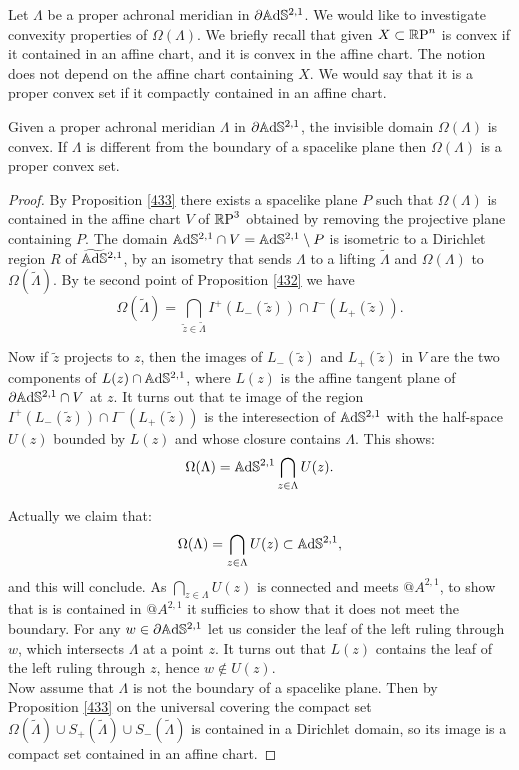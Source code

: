 Let $\Lambda$ be a proper achronal meridian in $\partial\mathbb{A}\mathrm{d}\mathbb{S}^{2,1}$. We would like to investigate convexity properties of $\Omega(\Lambda)$. We briefly recall that given $X \subset \mathbb{R}\text{P}^n$ is convex if it contained in an affine chart, and it is convex in the affine chart. The notion does not depend on the affine chart containing $X$. We would say that it is a proper convex set if it compactly contained in an affine chart. 

\begin{proposition}\label{461}
    Given a proper achronal meridian $\Lambda$ in $\partial\mathbb{A}\mathrm{d}\mathbb{S}^{2,1}$, the invisible domain $\Omega(\Lambda)$ is convex. If $\Lambda$ is different from the boundary of a spacelike plane then $\Omega(\Lambda)$ is a proper convex set.
\end{proposition}

\begin{proof}
    By Proposition \ref{433} there exists a spacelike plane $P$ such that $\Omega(\Lambda)$ is contained in the affine chart $V$ of $\mathbb{R}\text{P}^3$ obtained by removing the projective plane containing $P$. The domain $\mathbb{A}\mathrm{d}\mathbb{S}^{2,1}\cap V=\mathbb{A}\mathrm{d}\mathbb{S}^{2,1}\setminus P$ is isometric to a Dirichlet region $R$ of $\widetilde{\mathbb{A}\mathrm{d}\mathbb{S}}{}^{2,1}$, by an isometry that sends $\Lambda$ to a lifting $\widetilde{\Lambda}$ and $\Omega(\Lambda)$ to $\Omega(\widetilde{\Lambda})$. By te second point of Proposition \ref{432} we have 
    \[
        \Omega(\widetilde{\Lambda})=\bigcap_{\widetilde{z}\in\widetilde{\Lambda}}I^+(L_-(\widetilde{z}))\cap I^-(L_+(\widetilde{z})).
    \]

    Now if $\widetilde{z}$ projects to $z$, then the images of $L_-(\widetilde{z})$ and $L_+(\widetilde{z})$ in $V$ are the two components of $L(z)\cap \mathbb{A}\mathrm{d}\mathbb{S}^{2,1}$, where $L(z)$ is the affine tangent plane of $\partial\mathbb{A}\mathrm{d}\mathbb{S}^{2,1}\cap V$ at $z$. It turns out that te image of the region $I^+(L_-(\widetilde{z}))\cap I^-(L_+(\widetilde{z}))$ is the interesection of $\mathbb{A}\mathrm{d}\mathbb{S}^{2,1}$ with the half-space $U(z)$ bounded by $L(z)$ and whose closure contains $\Lambda$. This shows: 
\[
    \Omega(\Lambda)=\mathbb{A}\mathrm{d}\mathbb{S}^{2,1}\bigcap_{z\in\Lambda}U(z).
\] 

Actually we claim that:
\[
    \Omega(\Lambda)=\bigcap_{z\in\Lambda}U(z)\subset \mathbb{A}\mathrm{d}\mathbb{S}^{2,1},
\]
and this will conclude. As $\bigcap_{z\in\Lambda}U(z)$ is connected and meets $@A^{2,1}$, to show that is is contained in $@A^{2,1}$ it sufficies to show that it does not meet the boundary. For any $w\in\partial\mathbb{A}\mathrm{d}\mathbb{S}^{2,1}$ let us consider the leaf of the left ruling through $w$, which intersects $\Lambda$ at a point $z$. It turns out that $L(z)$ contains the leaf of the left ruling through $z$, hence $w\notin U(z)$. \\
Now assume that $\Lambda$ is not the boundary of a spacelike plane. Then by Proposition \ref{433} on the universal covering the compact set $\Omega(\widetilde{\Lambda})\cup S_+(\widetilde{\Lambda})\cup S_-(\widetilde{\Lambda})$ is contained in a Dirichlet domain, so its image is a compact set contained in an affine chart.
\end{proof}

